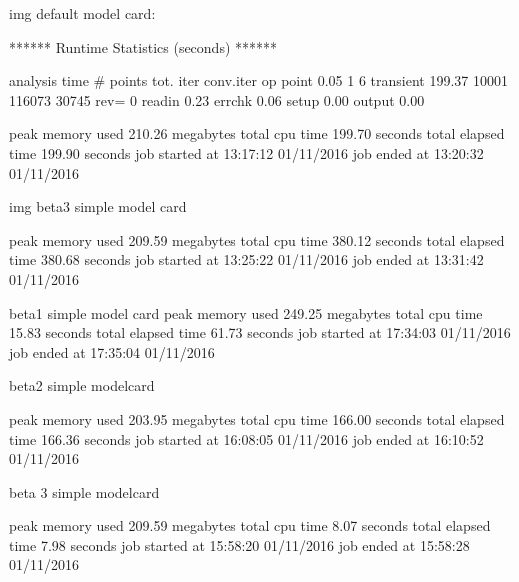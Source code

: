 img default model card:

  ******  Runtime Statistics (seconds)  ******

  analysis           time    # points   tot. iter  conv.iter
  op point           0.05           1           6
  transient        199.37       10001      116073       30745 rev=         0
  readin             0.23
  errchk             0.06
  setup              0.00
  output             0.00


           peak memory used        210.26 megabytes
           total cpu time          199.70 seconds
           total elapsed time      199.90 seconds
           job started at     13:17:12 01/11/2016
           job ended   at     13:20:32 01/11/2016
           
           
img beta3 simple model card

           peak memory used        209.59 megabytes
           total cpu time          380.12 seconds
           total elapsed time      380.68 seconds
           job started at     13:25:22 01/11/2016
           job ended   at     13:31:42 01/11/2016         

           beta1 simple model card
           peak memory used        249.25 megabytes
           total cpu time           15.83 seconds
           total elapsed time       61.73 seconds
           job started at     17:34:03 01/11/2016
           job ended   at     17:35:04 01/11/2016
           
           beta2 simple modelcard
           
           peak memory used        203.95 megabytes
           total cpu time          166.00 seconds
           total elapsed time      166.36 seconds
           job started at     16:08:05 01/11/2016
           job ended   at     16:10:52 01/11/2016 
           
           beta 3 simple modelcard
           
           peak memory used        209.59 megabytes
           total cpu time            8.07 seconds
           total elapsed time        7.98 seconds
           job started at     15:58:20 01/11/2016
           job ended   at     15:58:28 01/11/2016               
